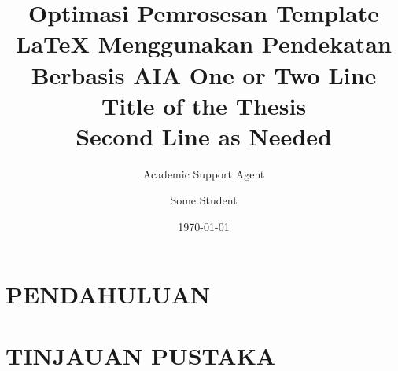 \documentclass{psutex}
\title{Optimasi Pemrosesan Template LaTeX Menggunakan Pendekatan Berbasis AI}
\author{Academic Support Agent}
\date{\today}
\begin{document}
\maketitle

\begin{abstract}

\end{abstract}

\chapter{PENDAHULUAN}


\chapter{TINJAUAN PUSTAKA}


\usepackage{graphicx}
\usepackage{rotating} %
\usepackage{tablefootnote} %

\usepackage{url}


\usepackage{graphicx}
\usepackage{amsmath}
\usepackage{amssymb}
\usepackage{gensymb} %
\usepackage[dvipsnames]{xcolor} %
\usepackage{cite}
\usepackage{booktabs}
\usepackage{tabularx}
\usepackage[flushleft]{threeparttable}
\usepackage{dcolumn}
\usepackage{float}
\usepackage{longtable}

\DeclareMathOperator*{\argmin}{argmin}
\DeclareMathOperator*{\argmax}{argmax}
\newcommand{\figscale}{1.0}

\newcommand{\shortnote}[1]{\footnote{\color{red}#1}}

\renewcommand{\arraystretch}{1.0}


\title{A One or Two Line Title of the Thesis \\ Second Line as Needed} %
\author{Some Student}
\end{document}
